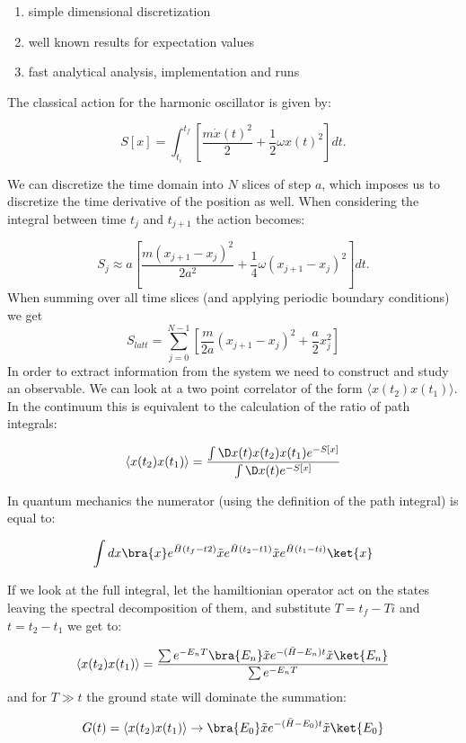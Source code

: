 \documentclass[%
oneside,                 %
final,                   %
10pt]{article}
\begin{document}
\begin{enumerate}
\item simple dimensional discretization

\item well known results for expectation values

\item fast analytical analysis, implementation and runs 
\end{enumerate}

\noindent
The classical action for the harmonic oscillator is given by:

\[
	S[x] = \int_{t_i}^{t_f} \left[ \frac{m\dot{x}(t)^2}{2} + \frac{1}{2}\omega x(t)^2\right] dt.
\]

We can discretize the time domain into $N$ slices of step $a$, which imposes us to discretize the time derivative of the position as well. When considering the integral between time $t_j$ and $t_{j+1}$ the action becomes:

\[
	S_{j} \approx a\left[ \frac{m(x_{j+1}-x_j)^2}{2a^2} + \frac{1}{4}\omega (x_{j+1} - x_j)^2 \right] dt.
\]
When summing over all time slices (and applying periodic boundary conditions) we get
\[	
	S_{latt} = \sum_{j = 0}^{N-1} \left[ \frac{m}{2a}(x_{j+1}-x_j)^2 + \frac{a}{2} x_j^2 \right]
\]
In order to extract information from the system we need to construct and study an observable. We can look at a two point correlator of the form $\langle x(t_2)x(t_1) \rangle$.  
In the continuum this is equivalent to the calculation of the ratio of path integrals:

\[
	\langle x(t_2)x(t_1) \rangle = \frac{\int \D x(t) x(t_2) x(t_1) e^{-S[x]}}{\int \D x(t) e^{-S[x]}}
\]

In quantum mechanics the numerator (using the definition of the path integral) is equal to:

\[	
	\int dx \bra{x} e^{\bar{H}(t_f-t2)} \tilde{x} e^{\bar{H}(t_2-t1)} \tilde{x} e^{\bar{H}(t_1-ti)} \ket{x}
\]

If we look at the full integral, let the hamiltionian operator act on the states leaving the spectral decomposition of them, and substitute $T = t_f-Ti$ and $t = t_2 - t_1$ we get to:

\[
	\langle x(t_2)x(t_1) \rangle = \frac{\sum e^{-E_n T} \bra{E_n} \tilde{x} e^{-(\bar{H}-E_n)t}  \tilde{x}\ket{E_n}}{\sum e^{-E_n T }}
\]
and for $T \gg t$ the ground state will dominate the summation:

\[
	G(t) = \langle x(t_2)x(t_1)\rangle \rightarrow  \bra{E_0} \tilde{x} e^{-(\bar{H}-E_0)t}  \tilde{x}\ket{E_0}
\]
\end{document}
